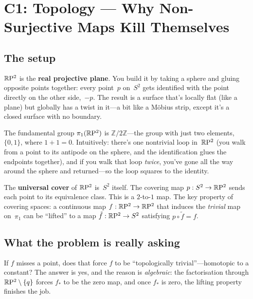 
\chapter{C1: Topology --- Why Non-Surjective Maps Kill Themselves}\label{ch:lesson-c1}

\section{The setup}

$\mathbb{R}\mathrm{P}^2$ is the \textbf{real projective plane}. You build it by taking a
sphere and gluing opposite points together: every point~$p$ on~$S^2$ gets
identified with the point directly on the other side,~$-p$. The result
is a surface that's locally flat (like a plane) but globally has a twist
in it---a bit like a M\"obius strip, except it's a closed surface with no
boundary.

The fundamental group $\pi_1(\mathbb{R}\mathrm{P}^2)$ is $\mathbb{Z}/2\mathbb{Z}$---the
group with just two elements, $\{0, 1\}$, where $1 + 1 = 0$. Intuitively:
there's one nontrivial loop in~$\mathbb{R}\mathrm{P}^2$ (you walk from a point to its
antipode on the sphere, and the identification glues the endpoints
together), and if you walk that loop \emph{twice}, you've gone all the
way around the sphere and returned---so the loop squares to the identity.

The \textbf{universal cover} of $\mathbb{R}\mathrm{P}^2$ is~$S^2$ itself. The covering map
$p : S^2 \to \mathbb{R}\mathrm{P}^2$ sends each point to its equivalence class. This is a
$2$-to-$1$ map. The key property of covering spaces: a continuous map
$f : \mathbb{R}\mathrm{P}^2 \to \mathbb{R}\mathrm{P}^2$ that induces the \emph{trivial} map on~$\pi_1$ can
be ``lifted'' to a map $\tilde{f} : \mathbb{R}\mathrm{P}^2 \to S^2$ satisfying
$p \circ \tilde{f} = f$.

\section{What the problem is really asking}

If $f$ misses a point, does that force $f$ to be ``topologically
trivial''---homotopic to a constant? The answer is yes, and the reason is
\emph{algebraic}: the factorisation through $\mathbb{R}\mathrm{P}^2 \setminus \{q\}$
forces $f_*$ to be the zero map, and once $f_*$ is zero, the lifting
property finishes the job.

